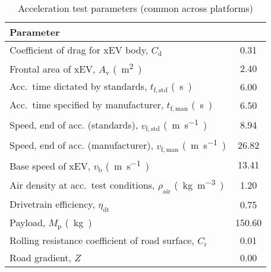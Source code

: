 

\begin{table}[!htbp]
	\centering
	\caption{Acceleration test parameters (common across  platforms)}
	\label{tbl:CommonVehicleParams}
	\begin{threeparttable}[t]
		\centering
		\begin{tabular*}{0.725\textwidth}{@{} l @{\extracolsep{\fill}}  S @{}}
			\toprule
			Parameter \\
			\midrule

			Coefficient of drag for xEV body, $C_\mathrm{d}$                           &  0.31    \\
			Frontal area of xEV, $A_\mathrm{v}$ \si{(m^2)}                             &  2.40    \\
			Acc.\ time dictated by standards, $t_\mathrm{f,std}$ \si{(s)}              &  6.00    \\
			Acc.\ time specified by manufacturer, $t_\mathrm{f,man}$ \si{(s)}          &  6.50    \\
			Speed, end of acc. (standards), $v_\mathrm{f,std}$ \si{(m.s^{-1})}         &  8.94    \\
			Speed, end of acc. (manufacturer), $v_\mathrm{f,man}$ \si{(m.s^{-1})}      &  26.82   \\
			Base speed of  xEV, $v_\mathrm{b}$ \si{(m.s^{-1})}                         &  13.41   \\
			Air density at acc.\ test conditions, $\rho_\mathrm{air}$ \si{(kg.m^{-3})} &  1.20    \\
			Drivetrain efficiency, $\eta_\mathrm{dt}$                                  &  0.75    \\
			Payload, $M_\mathrm{p}$ \si{(kg)}                                          &  150.60  \\
			Rolling resistance coefficient of road surface, $C_\mathrm{r}$             &  0.01    \\
			Road gradient, $Z$                                                         &  0.00    \\


\end{tabular*}
\end{threeparttable}
\end{table}
